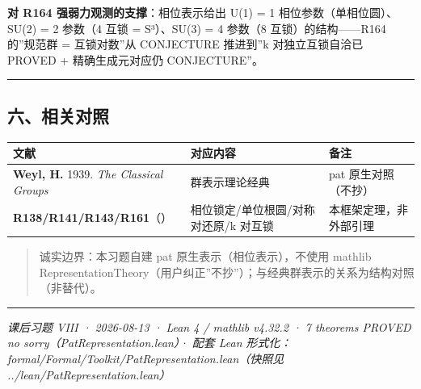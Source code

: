 \documentclass[
]{article}
\newcounter{none} %
\begin{document}
\textbf{对 R164 强弱力观测的支撑}：相位表示给出 U(1) = 1
相位参数（单相位圆）、SU(2) = 2 参数（4 互锁 = S³）、SU(3) = 4 参数（8
互锁）的结构------R164 的''规范群 = 互锁对数''从 CONJECTURE 推进到''k
对独立互锁自洽已 PROVED + 精确生成元对应仍 CONJECTURE''。

\begin{center}\rule{0.5\linewidth}{0.5pt}\end{center}

\subsection{六、相关对照}\label{ux516dux76f8ux5173ux5bf9ux7167}

{\def\LTcaptype{none} %
\begin{longtable}[]{@{}
 >{\raggedright\arraybackslash}p{}
 >{\raggedright\arraybackslash}p{}
 >{\raggedright\arraybackslash}p{}@{}}
\toprule\noalign{}
\begin{minipage}[b]{\linewidth}\raggedright
文献
\end{minipage} & \begin{minipage}[b]{\linewidth}\raggedright
对应内容
\end{minipage} & \begin{minipage}[b]{\linewidth}\raggedright
备注
\end{minipage} \\
\midrule\noalign{}
\endhead
\bottomrule\noalign{}
\endlastfoot
\textbf{Weyl, H.} 1939. \emph{The Classical Groups} & 群表示理论经典 &
pat 原生对照（不抄） \\
\textbf{R138/R141/R143/R161}（） & 相位锁定/单位根圆/对称对还原/k
对互锁 & 本框架定理，非外部引理 \\
\end{longtable}
}

\begin{quote}
诚实边界：本习题自建 pat 原生表示（相位表示），不使用 mathlib
RepresentationTheory（用户纠正''不抄''）；与经典群表示的关系为结构对照（非替代）。
\end{quote}

\begin{center}\rule{0.5\linewidth}{0.5pt}\end{center}

\emph{课后习题 VIII · 2026-08-13 · Lean 4 / mathlib v4.32.2 · 7
theorems PROVED no sorry（PatRepresentation.lean）· 配套 Lean
形式化：formal/Formal/Toolkit/PatRepresentation.lean（快照见
../lean/PatRepresentation.lean）}
\end{document}
